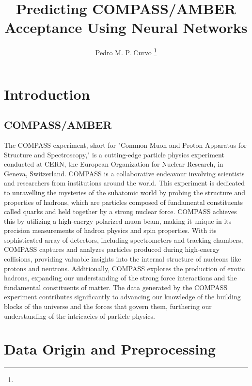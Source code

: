 \documentclass[EPJ,twocolumn]{webofc}
\title{Predicting COMPASS/AMBER Acceptance Using Neural Networks}
\author{Pedro M. P. Curvo\inst{1} \fnsep\thanks{\email{pedro.curvo@tecnico.ulisboa.pt}}}
\institute{
Instituto Superior T\'ecnico, Lisboa, Portugal
\vskip 2mm
{\normalfont\normalsize\textsf Project supervisor: Marcin Stolarski}
\mbox{}\hfill\today\hspace*{16mm}
}
\begin{document}
\maketitle

\section{Introduction}

\subsection{COMPASS/AMBER}

The COMPASS experiment, short for "Common Muon and Proton Apparatus for Structure 
and Spectroscopy," is a cutting-edge particle physics experiment conducted at CERN, 
the European Organization for Nuclear Research, in Geneva, Switzerland. COMPASS is a 
collaborative endeavour involving scientists and researchers from institutions around the world.
This experiment is dedicated to unravelling the mysteries of the subatomic world by probing the 
structure and properties of hadrons, which are particles composed of fundamental constituents 
called quarks and held together by a strong nuclear force. COMPASS achieves this by utilizing 
a high-energy polarized muon beam, making it unique in its precision measurements of hadron 
physics and spin properties.
With its sophisticated array of detectors, including spectrometers and tracking chambers, 
COMPASS captures and analyzes particles produced during high-energy collisions, providing 
valuable insights into the internal structure of nucleons like protons and neutrons. 
Additionally, COMPASS explores the production of exotic hadrons, expanding our understanding 
of the strong force interactions and the fundamental constituents of matter.
The data generated by the COMPASS experiment contributes significantly to advancing our 
knowledge of the building blocks of the universe and the forces that govern them, 
furthering our understanding of the intricacies of particle physics.


\section{Data Origin and Preprocessing}
\end{document}
